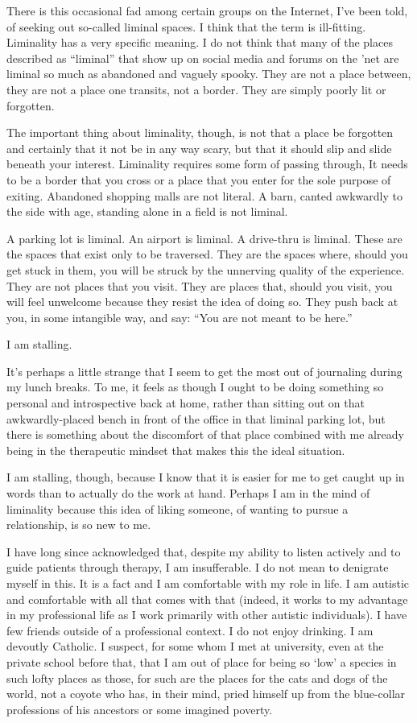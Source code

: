 There is this occasional fad among certain groups on the Internet, I've been told, of seeking out so-called liminal spaces. I think that the term is ill-fitting. Liminality has a very specific meaning. I do not think that many of the places described as ``liminal'' that show up on social media and forums on the 'net are liminal so much as abandoned and vaguely spooky. They are not a place between, they are not a place one transits, not a border. They are simply poorly lit or forgotten.

The important thing about liminality, though, is not that a place be forgotten and certainly that it not be in any way scary, but that it should slip and slide beneath your interest. Liminality requires some form of passing through, It needs to be a border that you cross or a place that you enter for the sole purpose of exiting. Abandoned shopping malls are not literal. A barn, canted awkwardly to the side with age, standing alone in a field is not liminal.

A parking lot is liminal. An airport is liminal. A drive-thru is liminal. These are the spaces that exist only to be traversed. They are the spaces where, should you get stuck in them, you will be struck by the unnerving quality of the experience. They are not places that you visit. They are places that, should you visit, you will feel unwelcome because they resist the idea of doing so. They push back at you, in some intangible way, and say: ``You are not meant to be here.''

I am stalling.

It's perhaps a little strange that I seem to get the most out of journaling during my lunch breaks. To me, it feels as though I ought to be doing something so personal and introspective back at home, rather than sitting out on that awkwardly-placed bench in front of the office in that liminal parking lot, but there is something about the discomfort of that place combined with me already being in the therapeutic mindset that makes this the ideal situation.

I am stalling, though, because I know that it is easier for me to get caught up in words than to actually do the work at hand. Perhaps I am in the mind of liminality because this idea of liking someone, of wanting to pursue a relationship, is so new to me.

I have long since acknowledged that, despite my ability to listen actively and to guide patients through therapy, I am insufferable. I do not mean to denigrate myself in this. It is a fact and I am comfortable with my role in life. I am autistic and comfortable with all that comes with that (indeed, it works to my advantage in my professional life as I work primarily with other autistic individuals). I have few friends outside of a professional context. I do not enjoy drinking. I am devoutly Catholic. I suspect, for some whom I met at university, even at the private school before that, that I am out of place for being so `low' a species in such lofty places as those, for such are the places for the cats and dogs of the world, not a coyote who has, in their mind, pried himself up from the blue-collar professions of his ancestors or some imagined poverty.

